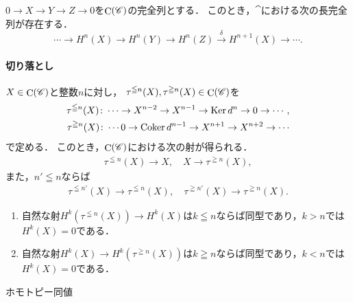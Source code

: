 \begin{Proposition}
    $0\to X\to Y\to Z\to 0$を$\mathop{\mathrm{C}}\nolimits(\mathscr{C})$の完全列とする．
    このとき，$\cat$における次の長完全列が存在する．
    \begin{equation*}
        \cdots\to 
        H^{n}(X)\to H^{n}(Y)\to H^{n}(Z)
        \overset{\delta}{\longrightarrow} 
        H^{n+1}(X)\to \cdots.
    \end{equation*}
\end{Proposition}

\paragraph*{切り落とし}
$X\in\mathop{\mathrm{C}}\nolimits(\mathscr{C})$と整数$n$に対し，
$\tau^{\leqq n}(X),\tau^{\geqq n}(X)\in\mathop{\mathrm{C}}\nolimits(\mathscr{C})$を
\begin{align}
    \tau^{\leqq n}(X)\colon 
    \cdots\to X^{n-2}\to X^{n-1}\to \mathop{\mathrm{Ker}}\nolimits{d^n}\to0\to\cdots,\\
    \tau^{\geqq n}(X)\colon 
    \cdots 0\to \mathop{\mathrm{Coker}}\nolimits{d^{n-1}}\to X^{n+1}\to X^{n+2}\to\cdots
\end{align}
で定める．
このとき，$\mathop{\mathrm{C}}\nolimits(\mathscr{C})$における次の射が得られる．
\begin{align*}
    \tau^{\leqq n}(X)\to X,\quad X\to\tau^{\geqq n}(X),
\end{align*}
また，$n'\leqq n$ならば
\begin{align*}
    \tau^{\leqq n'}(X)\to \tau^{\leqq n}(X),
    \quad 
    \tau^{\geqq n'}(X)\to\tau^{\geqq n}(X).
\end{align*}

\begin{Proposition}
    \begin{enumerate}
        \item 自然な射$H^k(\tau^{\leqq n}(X))\to H^k(X)$は$k\leqq n$ならば同型であり，$k>n$では$H^k(X)=0$である．
        \item 自然な射$H^k(X)\to H^k(\tau^{\geqq n}(X))$は$k\geqq n$ならば同型であり，$k<n$では$H^k(X)=0$である．
    \end{enumerate}
\end{Proposition}

\begin{Attention}
    ホモトピー同値    
\end{Attention}

